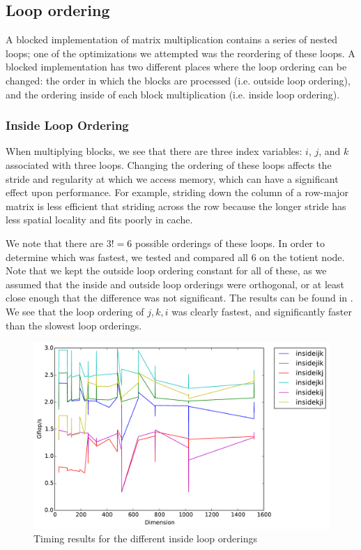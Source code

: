 \subsection{Loop ordering}\label{sec:loopordering}
A blocked implementation of matrix multiplication contains a series of nested
loops; one of the optimizations we attempted was the reordering of these loops.
A blocked implementation has two different places where the loop ordering can
be changed: the order in which the blocks are processed (i.e. outside loop
ordering), and the ordering inside of each block multiplication (i.e. inside
loop ordering).

\subsubsection{Inside Loop Ordering}
When multiplying blocks, we see that there are three index variables: $i$, $j$,
and $k$ associated with three loops. Changing the ordering of these loops
affects the stride and regularity at which we access memory, which can have a
significant effect upon performance. For example, striding down the column of a
row-major matrix is less efficient that striding across the row because the
longer stride has less spatial locality and fits poorly in cache.

We note that there are $3! = 6$ possible orderings of these loops. In order to
determine which was fastest, we tested and compared all 6 on the totient node.
Note that we kept the outside loop ordering constant for all of these, as we
assumed that the inside and outside loop orderings were orthogonal, or at least
close enough that the difference was not significant. The results can be found
in . We see that the loop ordering of $j,k,i$ was
clearly fastest, and significantly faster than the slowest loop orderings.

\begin{figure}[hh]
  \centering
  \includegraphics[width=\textwidth]{timing_insideloops.pdf}
  \caption{Timing results for the different inside loop orderings}
  \label{fig:insideloop}
\end{figure}

